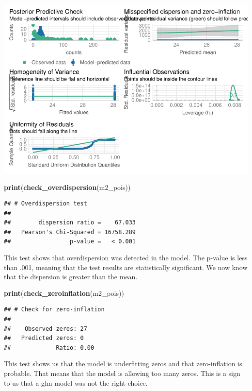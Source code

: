 \documentclass[
]{article}
\newenvironment{Shaded}{\begin{snugshade}}{\end{snugshade}}
\newcommand{\FunctionTok}[1]{\textcolor[rgb]{0.13,0.29,0.53}{\textbf{#1}}}
\newcommand{\NormalTok}[1]{#1}
\begin{document}
\includegraphics{hw1-lobstrs-eds241_files/figure-latex/unnamed-chunk-13-1.pdf}

\begin{Shaded}
\begin{Highlighting}[]
\FunctionTok{print}\NormalTok{(}\FunctionTok{check\_overdispersion}\NormalTok{(m2\_pois))}
\end{Highlighting}
\end{Shaded}

\begin{verbatim}
## # Overdispersion test
## 
##        dispersion ratio =    67.033
##   Pearson's Chi-Squared = 16758.289
##                 p-value =   < 0.001
\end{verbatim}

This test shows that overdispersion was detected in the model. The
p-value is less than .001, meaning that the test results are
statistically significant. We now know that the dispersion is greater
than the mean.

\begin{Shaded}
\begin{Highlighting}[]
\FunctionTok{print}\NormalTok{(}\FunctionTok{check\_zeroinflation}\NormalTok{(m2\_pois))}
\end{Highlighting}
\end{Shaded}

\begin{verbatim}
## # Check for zero-inflation
## 
##    Observed zeros: 27
##   Predicted zeros: 0
##             Ratio: 0.00
\end{verbatim}

This test shows us that the model is underfitting zeros and that
zero-inflation is probable. That means that the model is allowing too
many zeros. This is a sign to us that a glm model was not the right
choice.
\end{document}
